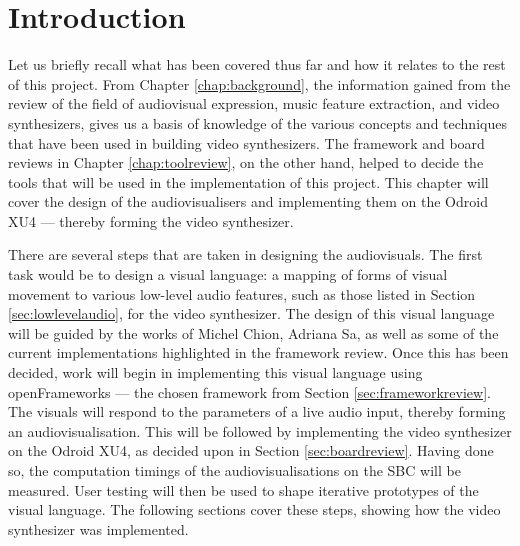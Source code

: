 \documentclass[../initial_thesis.tex]{subfiles}
\begin{document}
\section{Introduction}


Let us briefly recall what has been covered thus far and how it relates to the rest of this project. From Chapter \ref{chap:background}, the information gained from the review of the field of audiovisual expression, music feature extraction, and video synthesizers, gives us a basis of knowledge of the various concepts and techniques that have been used in building video synthesizers. The framework and board reviews in Chapter \ref{chap:toolreview}, on the other hand, helped to decide the tools that will be used in the implementation of this project. This chapter will cover the design of the audiovisualisers and implementing them on the Odroid XU4 --- thereby forming the video synthesizer. \par

There are several steps that are taken in designing the audiovisuals. The first task would be to design a visual language: a mapping of forms of visual movement to various low-level audio features, such as those listed in Section \ref{sec:lowlevelaudio}, for the video synthesizer. The design of this visual language will be guided by the works of Michel Chion, Adriana Sa, as well as some of the current implementations highlighted in the framework review. Once this has been decided, work will begin in implementing this visual language using openFrameworks --- the chosen framework from Section \ref{sec:frameworkreview}. The visuals will respond to the parameters of a live audio input, thereby forming an audiovisualisation. This will be followed by implementing the video synthesizer on the Odroid XU4, as decided upon in Section \ref{sec:boardreview}. Having done so, the computation timings of the audiovisualisations on the SBC will be measured. User testing will then be used to shape iterative prototypes of the visual language. The following sections cover these steps, showing how the video synthesizer was implemented. 
\end{document}
